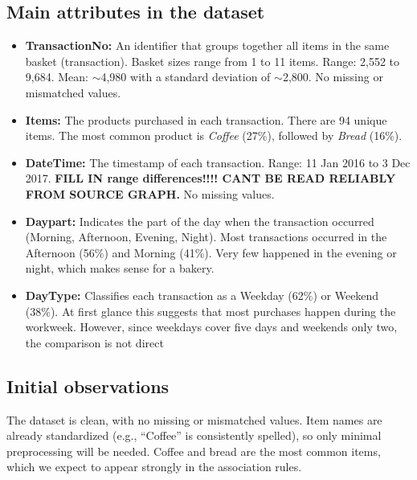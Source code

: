 \subsection*{Main attributes in the dataset}
\begin{itemize}
    \item \textbf{TransactionNo:} An identifier that groups together all items in the same basket (transaction).  
    Basket sizes range from 1 to 11 items.  
    Range: 2,552 to 9,684.  
    Mean: $\sim$4,980 with a standard deviation of $\sim$2,800.  
    No missing or mismatched values.  

    \item \textbf{Items:} The products purchased in each transaction.  
    There are 94 unique items.  
    The most common product is \textit{Coffee} (27\%), followed by \textit{Bread} (16\%).  

    \item \textbf{DateTime:} The timestamp of each transaction.  
    Range: 11 Jan 2016 to 3 Dec 2017.  
    \textbf{FILL IN range differences!!!! CANT BE READ RELIABLY FROM SOURCE GRAPH.}
    No missing values.  

    \item \textbf{Daypart:} Indicates the part of the day when the transaction occurred (Morning, Afternoon, Evening, Night).  
    Most transactions occurred in the Afternoon (56\%) and Morning (41\%).  
    Very few happened in the evening or night, which makes sense for a bakery.  

    \item \textbf{DayType:} Classifies each transaction as a Weekday (62\%) or Weekend (38\%).  
    At first glance this suggests that most purchases happen during the workweek. 
    However, since weekdays cover five days and weekends only two, the comparison is not direct

\end{itemize}

\subsection*{Initial observations}
The dataset is clean, with no missing or mismatched values.  
Item names are already standardized (e.g., ``Coffee'' is consistently spelled), 
so only minimal preprocessing will be needed.  
Coffee and bread are the most common items, 
which we expect to appear strongly in the association rules.  


